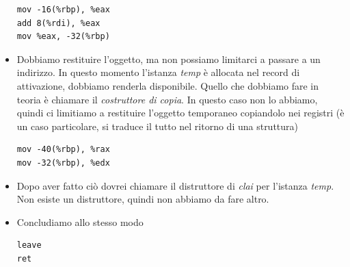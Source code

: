 \documentclass[11pt]{report}
\theoremstyle{definition}
\begin{document}
\begin{itemize}
\begin{verbatim}
mov -16(%rbp), %eax 
add 8(%rdi), %eax 
mov %eax, -32(%rbp) 
\end{verbatim}
\item Dobbiamo restituire l'oggetto, ma non possiamo limitarci a passare a un indirizzo. In questo momento l'istanza \emph{temp} è allocata nel record di attivazione, dobbiamo renderla disponibile. Quello che dobbiamo fare in teoria è chiamare il \emph{costruttore di copia}. In questo caso non lo abbiamo, quindi ci limitiamo a restituire l'oggetto temporaneo copiandolo nei registri (è un caso particolare, si traduce il tutto nel ritorno di una struttura)
\begin{verbatim}
mov -40(%rbp), %rax
mov -32(%rbp), %edx
\end{verbatim}
\item Dopo aver fatto ciò dovrei chiamare il distruttore di \emph{clai} per l'istanza \emph{temp}. Non esiste un distruttore, quindi non abbiamo da fare altro.
\item Concludiamo allo stesso modo
\begin{verbatim}
leave
ret
\end{verbatim}
\end{itemize}
\end{document}
